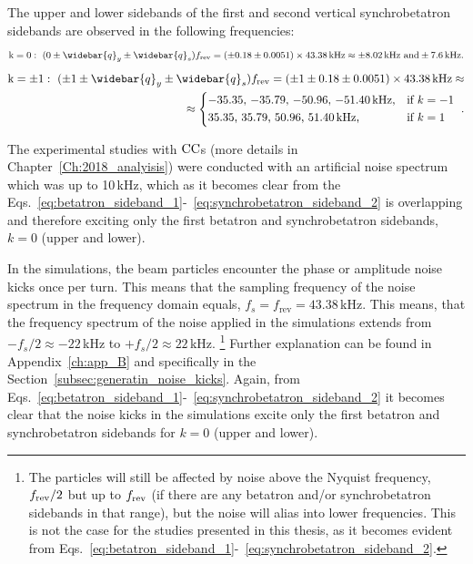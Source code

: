 The upper and lower sidebands of the first and second vertical synchrobetatron sidebands are observed in the following frequencies:
\begin{equation}\label{eq:synchrobetatron_sideband_1}
    \mathrm{k=0}: \ (0 \pm \widebar{q}_y \pm \widebar{q}_s) f_\mathrm{rev} = (\pm 0.18 \pm 0.0051) \times 43.38\mathrm{\,kHz} \approx \pm 8.02\mathrm{\,kHz} \ \mathrm{and} \pm 7.6\mathrm{\,kHz}.
\end{equation}
\begin{equation}\label{eq:synchrobetatron_sideband_2}
    \begin{split}
    \mathrm{k= \pm 1}: \ (\pm 1 \pm \widebar{q}_y \pm \widebar{q}_s) f_\mathrm{rev} = (\pm 1 \pm 0.18 \pm 0.0051)\times 43.38\mathrm{\,kHz} \approx \\ 
    \approx \begin{dcases*} 
        \text{$-$35.35, $-$35.79, $-$50.96, $-$51.40\,kHz,} & if  $k=-1$ \\ 
        \text{35.35, 35.79, 50.96, 51.40\,kHz,} & if  $k=1$  
        \end{dcases*} .
    \end{split}
\end{equation}


The experimental studies with ${\mathrm{CC}}$s (more details in Chapter~\ref{Ch:2018_analyisis}) were conducted with an artificial noise spectrum which was up to 10\,kHz, which as it becomes clear from the Eqs.~\eqref{eq:betatron_sideband_1}-~\eqref{eq:synchrobetatron_sideband_2} is overlapping and therefore exciting only the first betatron and synchrobetatron sidebands, $k=0$ (upper and lower).

In the simulations, the beam particles encounter the phase or amplitude noise kicks once per turn. This means that the sampling frequency of the noise spectrum in the frequency domain equals, $f_s=f_\mathrm{rev}=43.38$\,kHz. This means, that the frequency spectrum of the noise applied in the simulations extends from $-f_s/2 \approx -22$\,kHz to $+f_s/2 \approx 22$\,kHz. \footnote{The particles will still be affected by noise above the Nyquist frequency, ${f_\mathrm{rev}} /2$ but up to ${f_\mathrm{rev}}$ (if there are any betatron and/or synchrobetatron sidebands in that range), but the noise will alias into lower frequencies. This is not the case for the studies presented in this thesis, as it becomes evident from Eqs.~\eqref{eq:betatron_sideband_1}-~\eqref{eq:synchrobetatron_sideband_2}.} Further explanation can be found in Appendix~\ref{ch:app_B} and specifically in the Section~\ref{subsec:generatin_noise_kicks}. Again, from Eqs.~\eqref{eq:betatron_sideband_1}-~\eqref{eq:synchrobetatron_sideband_2} it becomes clear that the noise kicks in the simulations excite only the first betatron and synchrobetatron sidebands for $k=0$ (upper and lower).

